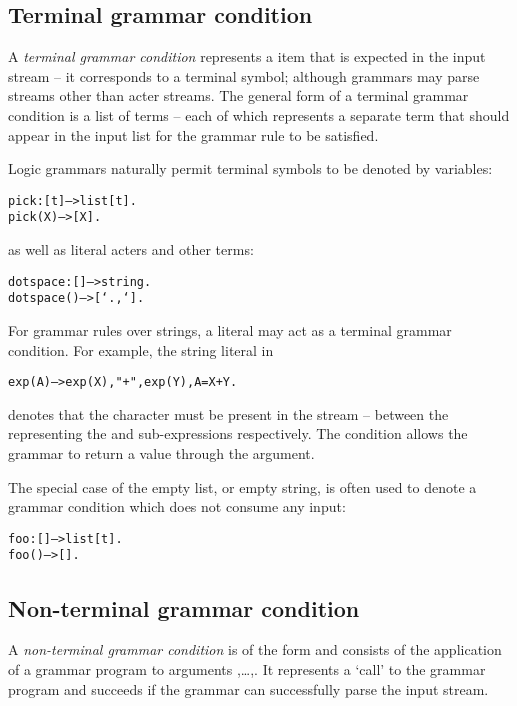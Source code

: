 \subsection{Terminal grammar condition}
\label{grammar:terminal}

A \emph{terminal grammar condition} represents a item that is expected in the input stream -- it corresponds to a terminal symbol; although \go grammars may parse streams other than acter streams. The general form of a terminal grammar condition is a list of terms -- each of which represents a separate term that should appear in the input list for the grammar rule to be satisfied.

Logic grammars naturally permit terminal symbols to be denoted by variables:
\begin{alltt}
pick:[t]-->list[t].
pick(X) --> [X].
\end{alltt}
as well as literal acters and other terms:
\begin{alltt}
dotspace:[]-->string.
dotspace() --> [`.,` ].
\end{alltt}

For grammar rules over strings, a  literal may act as a terminal grammar condition. For example, the string literal  in
\begin{alltt}
exp(A) --> exp(X), "+", exp(Y), A=X+Y.
\end{alltt}
denotes that the \q{+} character must be present in the stream -- between the  representing the  and  sub-expressions respectively. The condition  allows the  grammar to return a value through the argument.

The special case of the empty list, or empty string, is often used to denote a grammar condition which does not consume any input:
\begin{alltt}
foo:[]-->list[t].
foo() --> [].
\end{alltt}

\subsection{Non-terminal grammar condition}
\label{grammar:nonterminal}

A \emph{non-terminal grammar condition} is of the form  and consists of the application of a grammar program  to arguments ,\ldots,. It represents a `call' to the  grammar program and succeeds if the  grammar can successfully parse the input stream.

